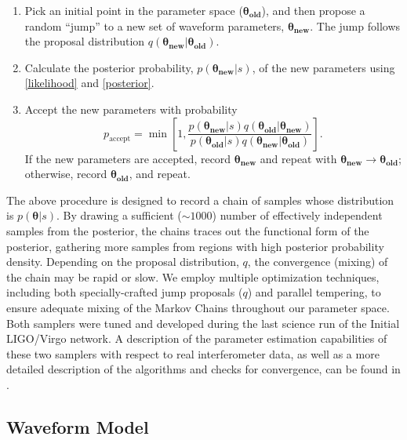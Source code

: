 \documentclass[11pt,a4paper]{emulateapj} 
\newcommand{\thpara}{\boldsymbol{\theta}}
\begin{document}
\begin{enumerate}
\item Pick an initial point in the parameter space
  ($\boldsymbol{\theta_{\text{old}}}$), and then propose a random
  ``jump'' to a new set of waveform parameters,
  $\boldsymbol{\theta_{\text{new}}}$.  The jump follows the
  proposal distribution $q\left(
  \boldsymbol{\theta_{\text{new}}} | \boldsymbol{\theta_{\text{old}}}
  \right)$.
\item Calculate the posterior probability,
  $p(\boldsymbol{\theta_{\text{new}}}|s)$, of the new parameters using
  \eqref{likelihood} and \eqref{posterior}.
\item Accept the new parameters with probability
  \begin{equation}
    p_\mathrm{accept} = \min \left[ 1,
      \frac{p(\boldsymbol{\theta_{\text{new}}}|s)
        q\left(\boldsymbol{\theta_{\text{old}}} |
        \boldsymbol{\theta_{\text{new}}}
        \right)}{p(\boldsymbol{\theta_{\text{old}}}|s)
        q\left(\boldsymbol{\theta_{\text{new}}} |
        \boldsymbol{\theta_{\text{old}}} \right)} \right].
  \end{equation}
  If the new parameters are accepted, record
  $\boldsymbol{\theta_\text{new}}$ and repeat with
  $\boldsymbol{\theta_\text{new}} \rightarrow
  \boldsymbol{\theta_\text{old}}$; otherwise, record
  $\boldsymbol{\theta_\text{old}}$, and repeat.
\end{enumerate} 
  
The above procedure is designed to record a chain of samples whose
distribution is $p\left(\thpara|s\right)$.  By drawing a sufficient
($\sim1000$) number of effectively independent samples from the
posterior, the chains traces out the functional form of the posterior,
gathering more samples from regions with high posterior probability
density.  Depending on the proposal distribution, $q$, the convergence
(mixing) of the chain may be rapid or slow.  We employ multiple
optimization techniques, including both specially-crafted jump
proposals ($q$) and parallel tempering, to ensure adequate mixing of
the Markov Chains throughout our parameter space.  Both samplers were
tuned and developed during the last science run of the Initial
LIGO/Virgo network.  A description of the parameter estimation
capabilities of these two samplers with respect to real interferometer
data, as well as a more detailed description of the algorithms and
checks for convergence, can be found in \cite{S6PE}.
  
 
\subsection{Waveform Model}
\label{waveformSection}
  
\end{document}

